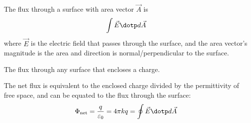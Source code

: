 \begin{definition}
  The flux through a surface with area vector $\vec{A}$ is
  \[
    \int \vec{E} \dotp d\vec{A}
  \]
  where $\vec{E}$ is the electric field that passes through the surface, and the area vector's magnitude is the area and direction is normal/perpendicular to the surface.
\end{definition}

\begin{definition}
  The flux through any surface that encloses a charge.
\end{definition}

\begin{namedtheorem}
  The net flux is equivalent to the enclosed charge divided by the permittivity of free space, and can be equated to the flux through the surface:
  \[
    \Phi_{\text{net}} = \frac{q}{\varepsilon_0} = 4\pi k q = \oint \vec{E} \dotp d\vec{A}
  \]
\end{namedtheorem}

